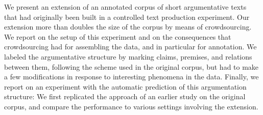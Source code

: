 We present an extension of an annotated corpus of short argumentative texts that had originally been built in a controlled text production experiment. Our extension more than doubles the size of the corpus by means of crowdsourcing. We report on the setup of this experiment and on the consequences that crowdsourcing had for assembling the data, and in particular for annotation. We labeled the argumentative structure by marking claims, premises, and relations between them, following the scheme used in the original corpus, but had to make a few modifications in response to interesting phenomena in the data. Finally, we report on an experiment with the automatic prediction of this argumentation structure: We first replicated the approach of an earlier study on the original corpus, and compare the performance to various settings involving the extension.
